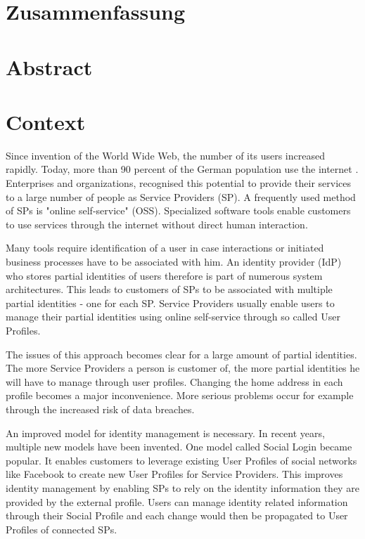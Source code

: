\documentclass[
     12pt,         %
     a4paper,      %
     BCOR=10mm,version=first,     %
     DIV=14,version=first,        %
     ]{scrreprt}
\begin{document}
\chapter*{Zusammenfassung}

\newpage

\chapter*{Abstract}

\newpage

\tableofcontents
\cleardoublepage
{}

\chapter{Context}
Since invention of the World Wide Web, the number of its users increased rapidly. Today, more than 90 percent of the German population use the internet \cite{Onlinestudie}. Enterprises and organizations, recognised this potential to provide their services to a large number of people as Service Providers (SP). A frequently used method of SPs is "online self-service" (OSS). Specialized software tools enable customers to use services through the internet without direct human interaction.

Many tools require identification of a user in case interactions or initiated business processes have to be associated with him. An identity provider (IdP) who stores partial identities of users therefore is part of numerous system architectures. This leads to customers of SPs to be associated with multiple partial identities - one for each SP. Service Providers usually enable users to manage their partial identities using online self-service through so called User Profiles.

The issues of this approach becomes clear for a large amount of partial identities. The more Service Providers a person is customer of, the more partial identities he will have to manage through user profiles. Changing the home address in each profile becomes a major inconvenience. More serious problems occur for example through the increased risk of data breaches.

An improved model for identity management is necessary. In recent years, multiple new models have been invented. One model called Social Login became popular. It enables customers to leverage existing User Profiles of social networks like Facebook to create new User Profiles for Service Providers. This improves identity management by enabling SPs to rely on the identity information they are provided by the external profile. Users can manage identity related information through their Social Profile and each change would then be propagated to User Profiles of connected SPs.
\end{document}
